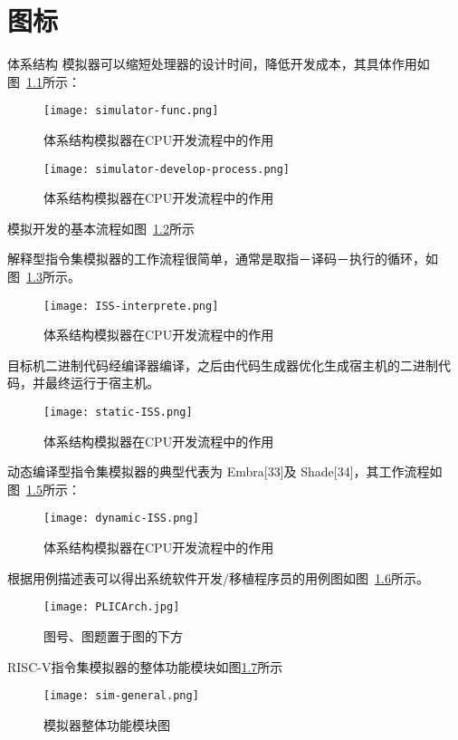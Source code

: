 
\chapter{图标}

体系结构
模拟器可以缩短处理器的设计时间，降低开发成本，其具体作用如图~\ref{fig:sim-func}所示：
\begin{figure}[h]
  \centering
  \texttt{[image: simulator-func.png]}
  \caption{体系结构模拟器在CPU开发流程中的作用}
  \label{fig:sim-func}
\end{figure}

\begin{figure}[h]
  \centering
  \texttt{[image: simulator-develop-process.png]}
  \caption{体系结构模拟器在CPU开发流程中的作用}
  \label{fig:sim-dev-process}
\end{figure}
模拟开发的基本流程如图~\ref{fig:sim-dev-process}所示

解释型指令集模拟器的工作流程很简单，通常是取指－译码－执行的循环，如图~\ref{fig:ISS-interprete}所示。
\begin{figure}[h]
  \centering
  \texttt{[image: ISS-interprete.png]}
  \caption{体系结构模拟器在CPU开发流程中的作用}
  \label{fig:ISS-interprete}
\end{figure}

目标机二进制代码经编译器编译，之后由代码生成器优化生成宿主机的二进制代码，并最终运行于宿主机。
\begin{figure}[h]
  \centering
  \texttt{[image: static-ISS.png]}
  \caption{体系结构模拟器在CPU开发流程中的作用}
  \label{fig:static-ISS}
\end{figure}


动态编译型指令集模拟器的典型代表为 Embra[33]及 Shade[34]，其工作流程如图~\ref{fig:dynamic-ISS}所示：
\begin{figure}[h]
  \centering
  \texttt{[image: dynamic-ISS.png]}
  \caption{体系结构模拟器在CPU开发流程中的作用}
  \label{fig:dynamic-ISS}
\end{figure}


根据用例描述表可以得出系统软件开发/移植程序员的用例图如图~\ref{fig:badge}所示。
\begin{figure}[h]
  \centering
  \texttt{[image: PLICArch.jpg]}
  \caption{图号、图题置于图的下方}
  \label{fig:badge}
\end{figure}

RISC-V指令集模拟器的整体功能模块如图\ref{fig:sim_general}所示
\begin{figure}[h]
  \centering
  \texttt{[image: sim-general.png]}
  \caption{模拟器整体功能模块图}
  \label{fig:sim_general}
\end{figure}


